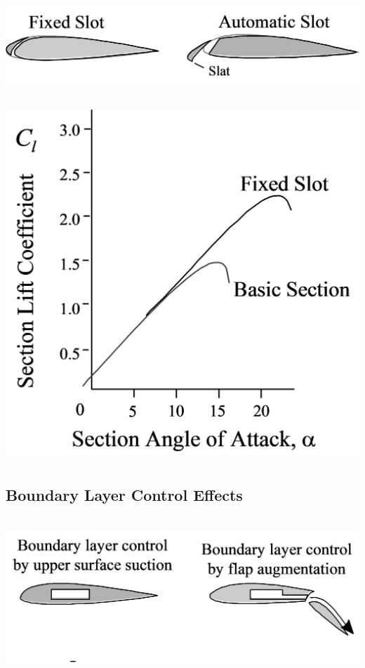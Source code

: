\documentclass[
]{book}
\begin{document}
\includegraphics[width=6.385in,height=1.393in]{media/05/image20.svg}

\includegraphics[width=5.4in,height=5.29in]{media/05/image21.svg}

\hypertarget{boundary-layer-control-effects}{%
\subsection*{Boundary Layer Control Effects}\label{boundary-layer-control-effects}}

\includegraphics[width=6.294in,height=2.349in]{media/05/image22.svg}
\end{document}

